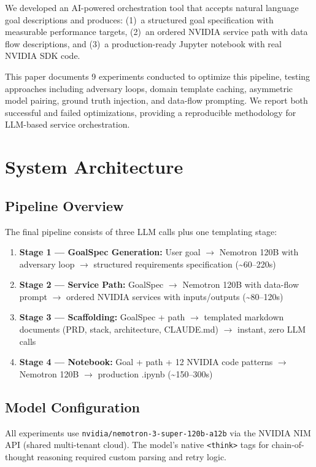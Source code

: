 \documentclass[conference]{IEEEtran}
\begin{document}
We developed an AI-powered orchestration tool that accepts natural language goal descriptions and produces: (1)~a structured goal specification with measurable performance targets, (2)~an ordered NVIDIA service path with data flow descriptions, and (3)~a production-ready Jupyter notebook with real NVIDIA SDK code.

This paper documents 9 experiments conducted to optimize this pipeline, testing approaches including adversary loops, domain template caching, asymmetric model pairing, ground truth injection, and data-flow prompting. We report both successful and failed optimizations, providing a reproducible methodology for LLM-based service orchestration.

\section{System Architecture}

\subsection{Pipeline Overview}

The final pipeline consists of three LLM calls plus one templating stage:

\begin{enumerate}
    \item \textbf{Stage 1 --- GoalSpec Generation:} User goal $\rightarrow$ Nemotron 120B with adversary loop $\rightarrow$ structured requirements specification (\textasciitilde60--220s)
    \item \textbf{Stage 2 --- Service Path:} GoalSpec $\rightarrow$ Nemotron 120B with data-flow prompt $\rightarrow$ ordered NVIDIA services with inputs/outputs (\textasciitilde80--120s)
    \item \textbf{Stage 3 --- Scaffolding:} GoalSpec + path $\rightarrow$ templated markdown documents (PRD, stack, architecture, CLAUDE.md) $\rightarrow$ instant, zero LLM calls
    \item \textbf{Stage 4 --- Notebook:} Goal + path + 12 NVIDIA code patterns $\rightarrow$ Nemotron 120B $\rightarrow$ production .ipynb (\textasciitilde150--300s)
\end{enumerate}

\subsection{Model Configuration}

All experiments use \texttt{nvidia/nemotron-3-super-120b-a12b} via the NVIDIA NIM API (shared multi-tenant cloud). The model's native \texttt{<think>} tags for chain-of-thought reasoning required custom parsing and retry logic.
\end{document}
